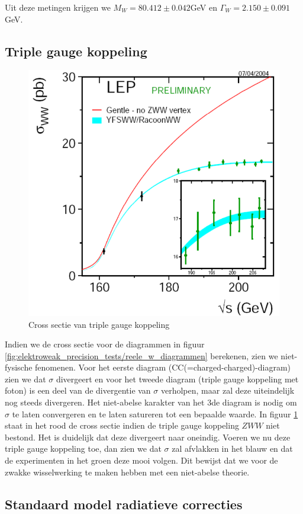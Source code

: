 \documentclass[../main.tex]{subfiles}
\begin{document}
Uit deze metingen krijgen we $M_W = 80.412 \pm 0.042$GeV en $\Gamma_W = 2.150 \pm 0.091$GeV.

\subsection{Triple gauge koppeling}%
\label{sub:triple_gauge_koppeling}

\begin{figure}[h]
    \centering
    \includegraphics[width=0.4\linewidth]{elektroweak_precision_tests/w_sigma_sat.png}
    \caption{Cross sectie van triple gauge koppeling}%
    \label{fig:elektroweak_precision_tests/w_sigma_sat}
\end{figure}

Indien we de cross sectie voor de diagrammen in figuur \ref{fig:elektroweak_precision_tests/reele_w_diagrammen} berekenen, zien we niet-fysische fenomenen. Voor het eerste diagram (CC(=charged-charged)-diagram) zien we dat $\sigma$ divergeert en voor het tweede diagram (triple gauge koppeling met foton) is een deel van de divergentie van $\sigma$ verholpen, maar zal deze uiteindelijk nog steeds divergeren. Het niet-abelse karakter van het 3de diagram is nodig om $\sigma$ te laten convergeren en te laten satureren tot een bepaalde waarde. In figuur \ref{fig:elektroweak_precision_tests/w_sigma_sat} staat in het rood de cross sectie indien de triple gauge koppeling $ZWW$ niet bestond. Het is duidelijk dat deze divergeert naar oneindig. Voeren we nu deze triple gauge koppeling toe, dan zien we dat $\sigma$ zal afvlakken in het blauw en dat de experimenten in het groen deze mooi volgen. Dit bewijst dat we voor de zwakke wisselwerking te maken hebben met een niet-abelse theorie.

\subsection{Standaard model radiatieve correcties}%
\label{sub:sm_radiatieve_correcties}
\end{document}

